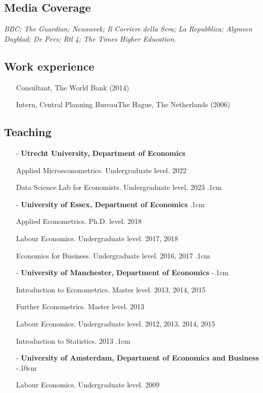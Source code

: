 \documentclass[11pt]{article}
\begin{document}
\subsection*{\sc Media Coverage}
{\emph{BBC; The Guardian; Newsweek; Il Corriere della Sera; La Repubblica; Algmeen Dagblad; De Pers; Rtl 4; The Times Higher Education}.

\subsection*{\sc Work experience}
\begin{itemize}[leftmargin=20pt]
    \itemsep-.1cm
    \item[] Consultant, The World Bank (2014)
    \item[] Intern, Central Planning Bureau\textendash The Hague, The Netherlands (2006)
\end{itemize}

\subsection*{\sc Teaching}
\begin{itemize}[leftmargin=20pt]
    \itemsep0cm
    \item[-]\textbf{Utrecht University, Department of Economics}
    \item[] Applied Microeconometrics. Undergraduate level. 2022
    \item[] Data Science Lab for Economists. Undergraduate level. 2023 
    \itemsep.1cm
    \item[-]\textbf{University of Essex, Department of Economics}
    \itemsep.1cm
    \item[] Applied Econometrics. Ph.D. level. 2018
    \item[] Labour Economics. Undergraduate level. 2017, 2018
    \item[] Economics for Business. Undergraduate level. 2016, 2017
    \itemsep.1cm
    \item[-]\textbf{University of Manchester, Department of Economics}
    \itemsep-.1cm
    \item[] Introduction to Econometrics. Master level. 2013, 2014, 2015
    \item[] Further Econometrics. Master level. 2013
    \item[] Labour Economics. Undergraduate level. 2012, 2013, 2014, 2015
    \item[] Introduction to Statistics. 2013
    \itemsep.1cm
    \item[-]\textbf{University of Amsterdam, Department of Economics and Business}
    \itemsep-.10cm
    \item[] Labour Economics. Undergraduate level. 2009


\end{itemize}}
\end{document}
